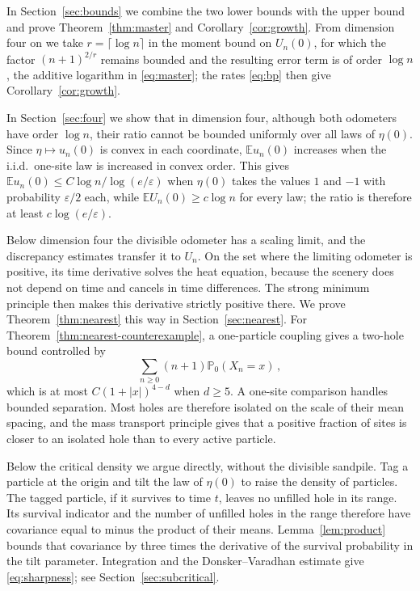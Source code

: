 \documentclass[11pt]{amsart}
\theoremstyle{plain}
\theoremstyle{definition}
\newcommand{\E}{\mathbb{E}}
\renewcommand{\P}{\mathbb{P}}
\newcommand{\eps}{\varepsilon}
\begin{document}
In Section~\ref{sec:bounds} we combine the two lower bounds with the upper
bound and prove Theorem~\ref{thm:master} and Corollary~\ref{cor:growth}. From
dimension four on we take $r=\lceil\log n\rceil$ in the moment bound on
$U_n(0)$, for which the factor $(n+1)^{2/r}$ remains bounded and the resulting error term is
of order $\log n$, the additive logarithm in \eqref{eq:master}; the rates
\eqref{eq:bp} then give Corollary~\ref{cor:growth}.

In Section~\ref{sec:four} we show that in dimension four, although both
odometers have order $\log n$, their ratio cannot be bounded uniformly over all
laws of $\eta(0)$. Since $\eta\mapsto u_n(0)$ is convex in each coordinate,
$\E u_n(0)$ increases when the i.i.d.\ one-site law is increased in convex
order. This gives $\E u_n(0)\leq C\log n/\log(e/\eps)$ when $\eta(0)$ takes the values
$1$ and $-1$ with probability $\eps/2$ each, while $\E U_n(0)\geq c\log n$ for every law;
the ratio is therefore at least $c\log(e/\eps)$.

Below dimension four the divisible odometer has a scaling limit, and the
discrepancy estimates transfer it to $U_n$. On the set where the limiting
odometer is positive, its time derivative solves the heat equation, because the
scenery does not depend on time and cancels in time differences. The strong
minimum principle then makes this derivative strictly positive there.
We prove Theorem~\ref{thm:nearest} this way in Section~\ref{sec:nearest}.
For Theorem~\ref{thm:nearest-counterexample}, a one-particle coupling gives a two-hole bound controlled by
\[
	\sum_{n\geq0}(n+1)\P_0(X_n=x)\,,
\]
which is at most $C(1+|x|)^{4-d}$ when $d\geq5$. A one-site comparison handles
bounded separation. Most holes are therefore isolated on the scale of their
mean spacing, and the mass transport principle gives that a positive fraction of sites is
closer to an isolated hole than to every active particle.

Below the critical density we argue directly, without the divisible sandpile.
Tag a particle at the origin and tilt the law of $\eta(0)$ to raise the density
of particles. The tagged particle, if it survives to time $t$, leaves no unfilled
hole in its range. Its survival indicator and the number of unfilled holes in
the range therefore have covariance equal to minus the product of their means.
Lemma~\ref{lem:product} bounds that covariance by three times the derivative of
the survival probability in the tilt parameter. Integration and the Donsker--Varadhan estimate give
\eqref{eq:sharpness}; see Section~\ref{sec:subcritical}.
\end{document}
